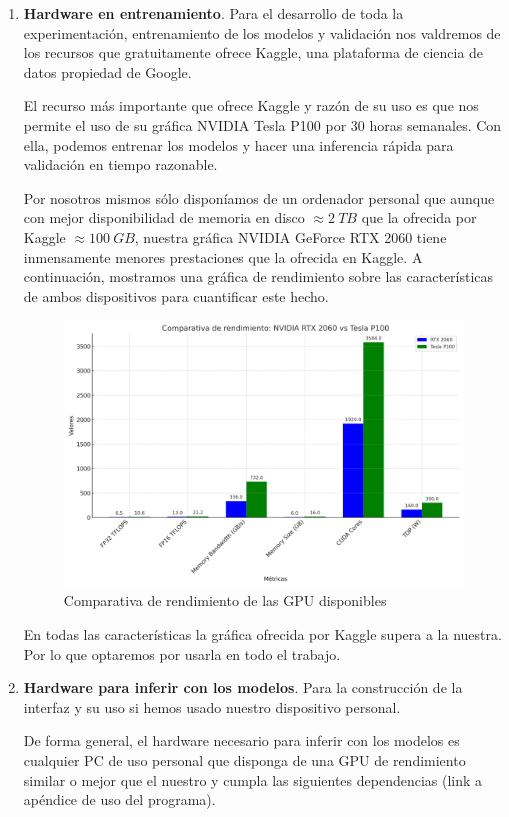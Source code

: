 \begin{enumerate}
	\item \textbf{Hardware en entrenamiento}. Para el desarrollo de toda la experimentación, entrenamiento de los modelos y validación nos valdremos de los recursos que gratuitamente ofrece Kaggle, una plataforma de ciencia de datos propiedad de Google. 
	
	El recurso más importante que ofrece Kaggle y razón de su uso es que nos permite el uso de su gráfica NVIDIA Tesla P100 por 30 horas semanales. Con ella, podemos entrenar los modelos y hacer una inferencia rápida para validación en tiempo razonable.
	
	Por nosotros mismos sólo disponíamos de un ordenador personal que aunque con mejor disponibilidad de memoria en disco $\approx 2\ TB$ que la ofrecida por Kaggle $\approx 100\ GB$, nuestra gráfica NVIDIA GeForce RTX 2060 tiene inmensamente menores prestaciones que la ofrecida en Kaggle. A continuación, mostramos una gráfica de rendimiento sobre las características de ambos dispositivos para cuantificar este hecho.
	
	\begin{figure}[H]
		\centering
		\includegraphics[width=1.0\linewidth]{imagenes/comparativa_rtx2060tesla.png}
		\caption{Comparativa de rendimiento de las GPU disponibles}
	\end{figure}
	
	En todas las características la gráfica ofrecida por Kaggle supera a la nuestra. Por lo que optaremos por usarla en todo el trabajo.
	
	\item \textbf{Hardware para inferir con los modelos}. Para la construcción de la interfaz y su uso si hemos usado nuestro dispositivo personal.
	
	De forma general, el hardware necesario para inferir con los modelos es cualquier PC de uso personal que disponga de una GPU de rendimiento similar o mejor que el nuestro y cumpla las siguientes dependencias (link a apéndice de uso del programa). 
	
\end{enumerate}


